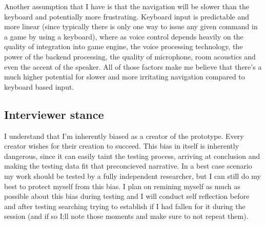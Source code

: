 Another assumption that I have is that the navigation will be slower than the keyboard and potentially more frustrating. Keyboard input is predictable and more linear (since typically there is only one way to issue any given command in a game by using a keyboard), where as 
voice control depends heavily on the quality of integration into game engine, the voice processing technology, the power of the backend processing, 
the quality of microphone, room acoustics and even the accent of the speaker. All of those factors make me believe that there's a much higher potential for slower and more irritating
navigation compared to keyboard based input.  
\subsection{Interviewer stance}
I understand that I'm inherently biased as a creator of the prototype. Every creator wishes for their creation to succeed. This bias in itself is inherently dangerous, since it can easily taint the testing process, arriving at conclusion and making the testing data fit that preconcieved narrative. In a best case scenario my work should be tested by a fully independent researcher, but I can still do my best to protect myself from this bias. I plan on remining myself as much as possible about this bias during testing and I will conduct self reflection before and after testing searching trying to establish if I had fallen for it during the session (and if so I;ll note those moments and make sure to not repeat them). 
